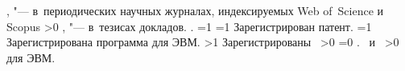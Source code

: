 {\begin{refsection}
            ,  "--- в~периодических научных журналах, индексируемых Web of~Science и Scopus\sloppy%
        \fi%
        \ifnum \value{citeauthorconf}>0%
            ,  "--- в~тезисах докладов.
        \else%
            .
        \fi%
        \ifnum \value{citeregistered}=1%
            \ifnum \value{citeauthorpatent}=1%
                Зарегистрирован  патент.
            \fi%
            \ifnum \value{citeauthorprogram}=1%
                Зарегистрирована  программа для ЭВМ.
            \fi%
        \fi%
        \ifnum \value{citeregistered}>1%
            Зарегистрированы\ %
            \ifnum \value{citeauthorpatent}>0%
            \sloppy%
            \ifnum \value{citeauthorprogram}=0 . \else \ и~\fi%
            \fi%
            \ifnum \value{citeauthorprogram}>0%
             для ЭВМ.
            \fi%
        \fi%
    \end{refsection}%
    \begin{refsection}
        \nocite{prog1}%
        \nocite{conf1}%
        \nocite{conf2}%
        \nocite{conf3}%
        \nocite{conf4}%
    \end{refsection}%
}


